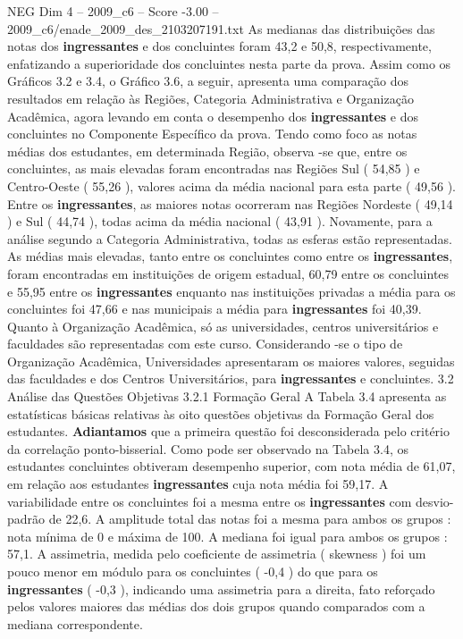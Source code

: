 \begin{textsample}{NEG Dim 4 – 2009\_c6 – Score -3.00 – 2009\_c6/enade\_2009\_des\_2103207191.txt}
As medianas das distribuições das notas dos \textbf{ingressantes} e dos concluintes foram 43,2 e 50,8, respectivamente, enfatizando a superioridade dos concluintes nesta parte da prova.
Assim como os Gráficos 3.2 e 3.4, o Gráfico 3.6, a seguir, apresenta uma comparação dos resultados em relação às Regiões, Categoria Administrativa e Organização Acadêmica, agora levando em conta o desempenho dos \textbf{ingressantes} e dos concluintes no Componente Específico da prova.
Tendo como foco as notas médias dos estudantes, em determinada Região, observa -se que, entre os concluintes, as mais elevadas foram encontradas nas Regiões Sul ( 54,85 ) e Centro-Oeste ( 55,26 ), valores acima da média nacional para esta parte ( 49,56 ).
Entre os \textbf{ingressantes}, as maiores notas ocorreram nas Regiões Nordeste ( 49,14 ) e Sul ( 44,74 ), todas acima da média nacional ( 43,91 ).
Novamente, para a análise segundo a Categoria Administrativa, todas as esferas estão representadas.
As médias mais elevadas, tanto entre os concluintes como entre os \textbf{ingressantes}, foram encontradas em instituições de origem estadual, 60,79 entre os concluintes e 55,95 entre os \textbf{ingressantes} enquanto nas instituições privadas a média para os concluintes foi 47,66 e nas municipais a média para \textbf{ingressantes} foi 40,39.
Quanto à Organização Acadêmica, só as universidades, centros universitários e faculdades são representadas com este curso.
Considerando -se o tipo de Organização Acadêmica, Universidades apresentaram os maiores valores, seguidas das faculdades e dos Centros Universitários, para \textbf{ingressantes} e concluintes. 3.2 Análise das Questões Objetivas 3.2.1 Formação Geral A Tabela 3.4 apresenta as estatísticas básicas relativas às oito questões objetivas da Formação Geral dos estudantes. \textbf{Adiantamos} que a primeira questão foi desconsiderada pelo critério da correlação ponto-bisserial.
Como pode ser observado na Tabela 3.4, os estudantes concluintes obtiveram desempenho superior, com nota média de 61,07, em relação aos estudantes \textbf{ingressantes} cuja nota média foi 59,17.
A variabilidade entre os concluintes foi a mesma entre os \textbf{ingressantes} com desvio-padrão de 22,6.
A amplitude total das notas foi a mesma para ambos os grupos : nota mínima de 0 e máxima de 100.
A mediana foi igual para ambos os grupos : 57,1.
A assimetria, medida pelo coeficiente de assimetria ( skewness ) foi um pouco menor em módulo para os concluintes ( -0,4 ) do que para os \textbf{ingressantes} ( -0,3 ), indicando uma assimetria para a direita, fato reforçado pelos valores maiores das médias dos dois grupos quando comparados com a mediana correspondente.

\end{textsample}
